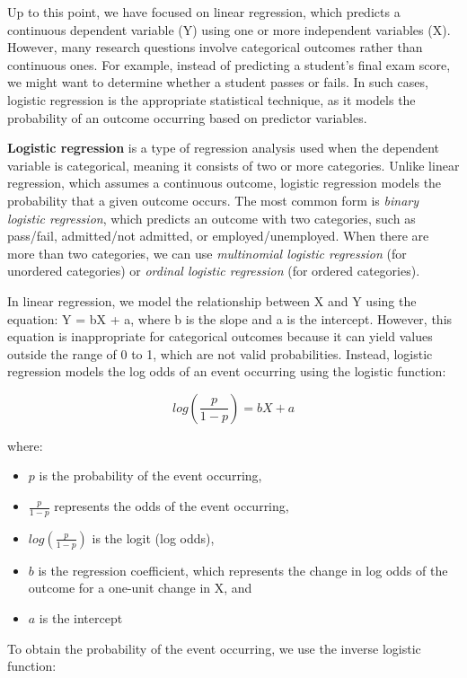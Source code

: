 \documentclass[
  letterpaper,
  DIV=11,
  numbers=noendperiod]{scrreprt}
\begin{document}
Up to this point, we have focused on linear regression, which predicts a
continuous dependent variable (Y) using one or more independent
variables (X). However, many research questions involve categorical
outcomes rather than continuous ones. For example, instead of predicting
a student's final exam score, we might want to determine whether a
student passes or fails. In such cases, logistic regression is the
appropriate statistical technique, as it models the probability of an
outcome occurring based on predictor variables.\,

\textbf{Logistic regression} is a type of regression analysis used when
the dependent variable is categorical, meaning it consists of two or
more categories. Unlike linear regression, which assumes a continuous
outcome, logistic regression models the probability that a given outcome
occurs. The most common form is \emph{binary logistic regression}, which
predicts an outcome with two categories, such as pass/fail, admitted/not
admitted, or employed/unemployed. When there are more than two
categories, we can use \emph{multinomial logistic regression} (for
unordered categories) or \emph{ordinal logistic regression} (for ordered
categories).

In linear regression, we model the relationship between X and Y using
the equation: Y = bX + a, where b is the slope and a is the intercept.
However, this equation is inappropriate for categorical outcomes because
it can yield values outside the range of 0 to 1, which are not valid
probabilities. Instead, logistic regression models the log odds of an
event occurring using the logistic function:

\[
log(\frac{p}{1-p}) = bX + a 
\]

where:

\begin{itemize}
\item
  \(p\) is the probability of the event occurring,
\item
  \(\frac{p}{1-p}\) represents the odds of the event occurring,
\item
  \(log(\frac{p}{1-p})\) is the logit (log odds),
\item
  \(b\) is the regression coefficient, which represents the change in
  log odds of the outcome for a one-unit change in X, and
\item
  \(a\) is the intercept
\end{itemize}

To obtain the probability of the event occurring, we use the inverse
logistic function:
\end{document}
